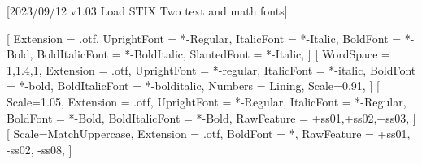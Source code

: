 
[2023/09/12 v1.03 Load STIX Two text and math fonts]

%
%
\ifpdftex
{}
\RequirePackage[T1]{fontenc}
\RequirePackage{bm}
\else
{}
%
\RequirePackage[warnings-off={mathtools-colon,mathtools-overbracket}]{unicode-math}
%
\setmainfont{STIXTwoText}[%
  Extension = .otf,
  UprightFont = *-Regular,
  ItalicFont = *-Italic,
  BoldFont = *-Bold,
  BoldItalicFont = *-BoldItalic,
  SlantedFont = *-Italic,
]
\setsansfont{texgyreheros}[%
  WordSpace = {1,1.4,1},
  Extension = .otf,
  UprightFont = *-regular,
  ItalicFont = *-italic,
  BoldFont = *-bold,
  BoldItalicFont = *-bolditalic,
  Numbers = Lining,
  Scale=0.91,%
]
\setmonofont{Inconsolatazi4}[%
  Scale=1.05,%
  Extension = .otf,
  UprightFont = *-Regular,
  ItalicFont = *-Regular,%
  BoldFont = *-Bold,
  BoldItalicFont = *-Bold,%
  RawFeature = {+ss01,+ss02,+ss03},
]
[%
  Scale=MatchUppercase,
  Extension = .otf,
  BoldFont = *,%
  RawFeature = {+ss01, -ss02, -ss08},
]
%
\newcommand*{\FRAC}[1]{{\addfontfeature{Fractions=On}#1}}%
\fi
